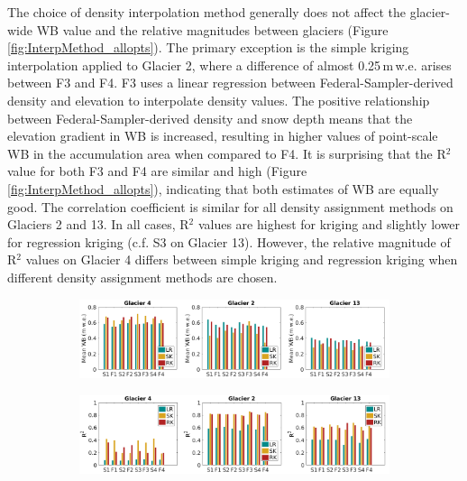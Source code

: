 \documentclass{sfuthesis}
\begin{document}
{The choice of density interpolation method generally does not affect the glacier-wide WB value and the relative magnitudes between glaciers (Figure \ref{fig:InterpMethod_allopts}). The primary exception is the simple kriging interpolation applied to Glacier 2, where a difference of almost 0.25\,m\,w.e. arises between F3 and F4. F3 uses a linear regression between Federal-Sampler-derived density and elevation to interpolate density values. The positive relationship between Federal-Sampler-derived density and snow depth means that the elevation gradient in WB is increased, resulting in higher values of point-scale WB in the accumulation area when compared to F4.  It is surprising that the R$^2$ value for both F3 and F4 are similar and high (Figure \ref{fig:InterpMethod_allopts}), indicating that both estimates of WB are equally good. The correlation coefficient is similar for all density assignment methods on Glaciers 2 and 13. In all cases, R$^2$ values are highest for kriging and slightly lower for regression kriging (c.f. S3 on Glacier 13). However, the relative magnitude of R$^2$ values on Glacier 4 differs between simple kriging and regression kriging when different density assignment methods are chosen.  


\begin{figure}
    \centering
    \begin{subfigure}[b]{\textwidth}
      \includegraphics[width=\textwidth]{InterpMethod_allopts.png}
        \caption[]{}
    \end{subfigure}
    
    \begin{subfigure}[b]{\textwidth}
      \includegraphics[width=\textwidth]{InterpMethod_alloptsR2.png}
        \caption[]{}
    \end{subfigure}


\end{figure}}
\end{document}
